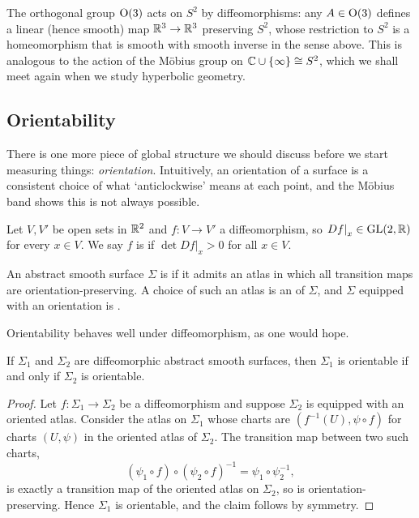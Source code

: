 \documentclass[a4paper]{scrartcl}
\begin{document}
\begin{example}[$\OO(3)$ Acting on $S^2$]
    The orthogonal group $\OO(3)$ acts on $S^2$ by diffeomorphisms: any $A \in \operatorname{O}(3)$ defines a linear (hence smooth) map $\mathbb{R}^3 \rightarrow \mathbb{R}^3$ preserving $S^2$, whose restriction to $S^2$ is a homeomorphism that is smooth with smooth inverse in the sense above. This is analogous to the action of the M\"obius group on $\mathbb{C} \cup \{\infty\} \cong S^2$, which we shall meet again when we study hyperbolic geometry.
\end{example}

\subsection{Orientability}

There is one more piece of global structure we should discuss before we start measuring things: \emph{orientation}. Intuitively, an orientation of a surface is a consistent choice of what `anticlockwise' means at each point, and the M\"obius band shows this is not always possible.

\begin{definition}
    Let $V, V'$ be open sets in $\mathbb{R}^2$ and $f: V \rightarrow V'$ a diffeomorphism, so $\left.Df\right|_x \in \operatorname{GL}(2, \mathbb{R})$ for every $x \in V$. We say $f$ is  if $\det \left.Df\right|_x > 0$ for all $x \in V$.
\end{definition}

\begin{definition}[Orientable]
    An abstract smooth surface $\Sigma$ is  if it admits an atlas in which all transition maps are orientation-preserving. A choice of such an atlas is an  of $\Sigma$, and $\Sigma$ equipped with an orientation is .
\end{definition}

Orientability behaves well under diffeomorphism, as one would hope.

\begin{lemma}
    If $\Sigma_1$ and $\Sigma_2$ are diffeomorphic abstract smooth surfaces, then $\Sigma_1$ is orientable if and only if $\Sigma_2$ is orientable.
\end{lemma}
\begin{proof}
    Let $f: \Sigma_1 \rightarrow \Sigma_2$ be a diffeomorphism and suppose $\Sigma_2$ is equipped with an oriented atlas. Consider the atlas on $\Sigma_1$ whose charts are $(f^{-1}(U), \psi \circ f)$ for charts $(U, \psi)$ in the oriented atlas of $\Sigma_2$. The transition map between two such charts,
    $$
    (\psi_1 \circ f) \circ (\psi_2 \circ f)^{-1} = \psi_1 \circ \psi_2^{-1},
    $$
    is exactly a transition map of the oriented atlas on $\Sigma_2$, so is orientation-preserving. Hence $\Sigma_1$ is orientable, and the claim follows by symmetry.
\end{proof}
\end{document}
